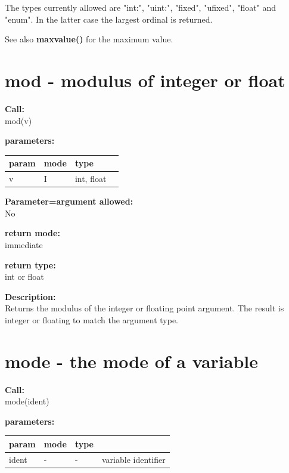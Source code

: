         The types currently allowed are "int:", "uint:", "fixed", "ufixed",
        "float" and "enum". In the latter case the largest ordinal is returned.
        
        See also {\bf maxvalue()}  for the maximum
        value.


    \section{mod - modulus of integer or float}\label{sec:ifmod}
        
        
        {\bf Call:} \\
        mod(v)
        
        {\bf parameters:} \\
        \begin{tabular}{| l | l | l | l |}
        \hline
        param  & mode & type & \\
        \hline \hline
        v & I & int, float &  \\ \hline
        \end{tabular}
        
        {\bf Parameter=argument allowed:} \\
        No
        
        {\bf return mode:} \\
        immediate

        {\bf return type:} \\
        int or float
        
        {\bf Description:} \\
        Returns the modulus of the integer or floating point argument.
        The result is integer or floating to match the argument type.


    \section{mode - the mode of a variable}\label{sec:ifmode}
        
        {\bf Call:} \\
        mode(ident)
        
        {\bf parameters:} \\
        \begin{tabular}{| l | l | l | l |}
        \hline
        param  & mode & type & \\
        \hline \hline
        ident & - &  -  & variable identifier \\ \hline
        \end{tabular}
        

